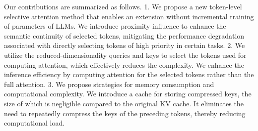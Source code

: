 Our contributions are summarized as follows. 1. We propose a new token-level selective attention method that enables an extension without incremental training of parameters of LLMs. We introduce proximity influence to enhance the semantic continuity of selected tokens, mitigating the performance degradation associated with directly selecting tokens of high priority in certain tasks. 2. We utilize the reduced-dimensionality queries and keys to select the tokens used for computing attention, which effectively reduces the complexity. We enhance the inference efficiency by computing attention for the selected tokens rather than the full attention. 3. We propose strategies for memory consumption and computational complexity. We introduce a cache for storing compressed keys, the size of which is negligible compared to the original KV cache. It eliminates the need to repeatedly compress the keys of the preceding tokens, thereby reducing computational load.
